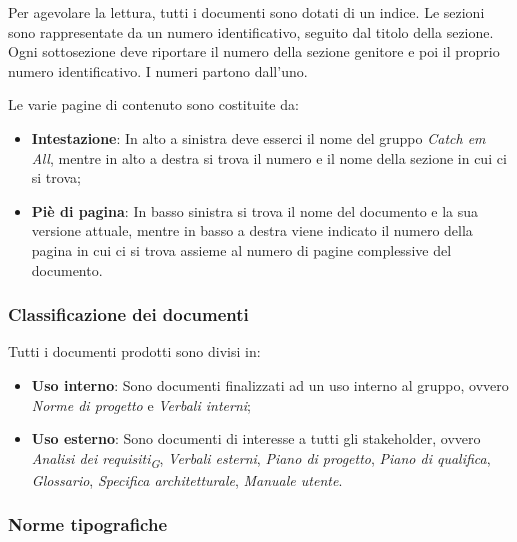 Per agevolare la lettura, tutti i documenti sono dotati di un indice. Le sezioni sono rappresentate da un numero identificativo, seguito dal titolo della sezione. Ogni sottosezione deve riportare il numero della sezione genitore e poi il proprio numero identificativo. I numeri partono dall'uno.

Le varie pagine di contenuto sono costituite da:
\begin{itemize}
    \item \textbf{Intestazione}: In alto a sinistra deve esserci il nome del gruppo \textit{Catch em All}, mentre in alto a destra si trova il numero e il nome della sezione in cui ci si trova;
    \item \textbf{Piè di pagina}: In basso sinistra si trova il nome del documento e la sua versione attuale, mentre in basso a destra viene indicato il numero della pagina in cui ci si trova assieme al numero di pagine complessive del documento.
\end{itemize}

\subsubsection{Classificazione dei documenti}
Tutti i documenti prodotti sono divisi in:
\begin{itemize}
    \item \textbf{Uso interno}: Sono documenti finalizzati ad un uso interno al gruppo, ovvero \textit{Norme di progetto} e \textit{Verbali interni};
    \item \textbf{Uso esterno}: Sono documenti di interesse a tutti gli stakeholder, ovvero \textit{Analisi dei requisiti\textsubscript{G}}, \textit{Verbali esterni}, \textit{Piano di progetto}, \textit{Piano di qualifica}, \textit{Glossario}, \textit{Specifica architetturale}, \textit{Manuale utente}.
\end{itemize}

\subsubsection{Norme tipografiche}

